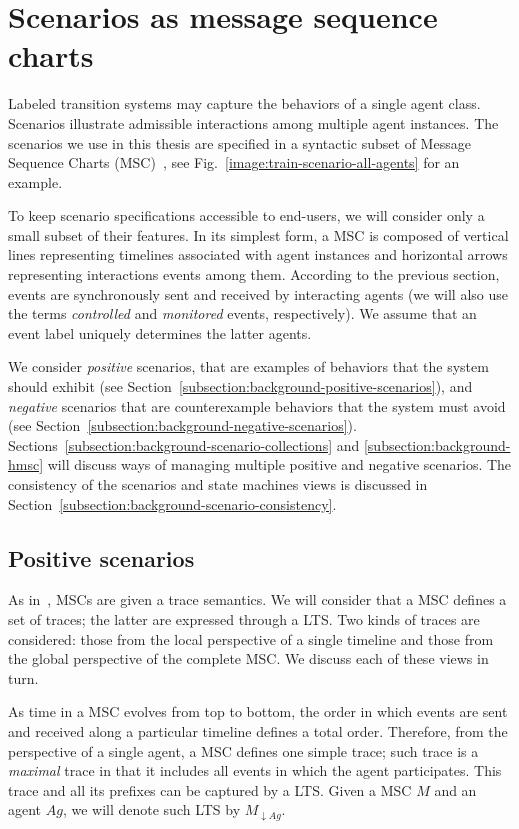 \section{Scenarios as message sequence charts\label{section:background-scenarios}}

Labeled transition systems may capture the behaviors of a single agent class. Scenarios illustrate admissible interactions among multiple agent instances. The scenarios we use in this thesis are specified in a syntactic subset of Message Sequence Charts (MSC)~\cite{ITU:1996}, see Fig.~\ref{image:train-scenario-all-agents} for an example. 

To keep scenario specifications accessible to end-users, we will consider only a small subset of their features. In its simplest form, a MSC is composed of vertical lines representing timelines associated with agent instances and horizontal arrows representing interactions events among them. According to the previous section, events are synchronously sent and received by interacting agents (we will also use the terms \emph{controlled} and \emph{monitored} events, respectively). We assume that an event label uniquely determines the latter agents. 

We consider \emph{positive} scenarios, that are examples of behaviors that the system should exhibit (see Section~\ref{subsection:background-positive-scenarios}), and \emph{negative} scenarios that are counterexample behaviors that the system must avoid (see Section~\ref{subsection:background-negative-scenarios}). Sections~\ref{subsection:background-scenario-collections} and \ref{subsection:background-hmsc} will discuss ways of managing multiple positive and negative scenarios. The consistency of the scenarios and state machines views is discussed in Section~\ref{subsection:background-scenario-consistency}.

\subsection{Positive scenarios\label{subsection:background-positive-scenarios}}

As in~\cite{Uchitel:2004}, MSCs are given a trace semantics. We will consider that a MSC defines a set of traces; the latter are expressed through a LTS. Two kinds of traces are considered: those from the local perspective of a single timeline and those from the global perspective of the complete MSC. We discuss each of these views in turn.

As time in a MSC evolves from top to bottom, the order in which events are sent and received along a particular timeline defines a total order. Therefore, from the perspective of a single agent, a MSC defines one simple trace; such trace is a \emph{maximal} trace in that it includes all events in which the agent participates. This trace and all its prefixes can be captured by a LTS. Given a MSC $M$ and an agent $Ag$, we will denote such LTS by $M_{\downarrow Ag}$.

